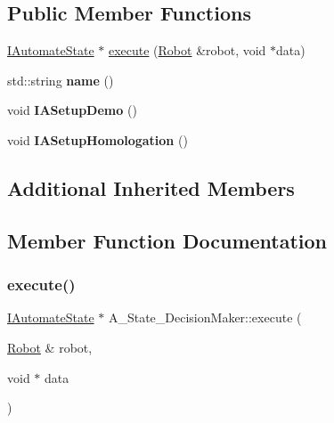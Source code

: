 \subsection*{Public Member Functions}
\begin{DoxyCompactItemize}
\item 
\hyperlink{classIAutomateState}{I\+Automate\+State} $\ast$ \hyperlink{classA__State__DecisionMaker_a960aa3cf18beb0b92fe1da1bb1ec42f1}{execute} (\hyperlink{classRobot}{Robot} \&robot, void $\ast$data)
\item 
\mbox{\label{classA__State__DecisionMaker_a1ef4270c4d26768849593f88b27b424d}} 
std\+::string {\bfseries name} ()
\item 
\mbox{\label{classA__State__DecisionMaker_a8060da7376c3223db8921c1bdc948f6e}} 
void {\bfseries I\+A\+Setup\+Demo} ()
\item 
\mbox{\label{classA__State__DecisionMaker_ac12110c5315179c96f5b9b0a73ab198b}} 
void {\bfseries I\+A\+Setup\+Homologation} ()
\end{DoxyCompactItemize}
\subsection*{Additional Inherited Members}


\subsection{Member Function Documentation}
\mbox{\label{classA__State__DecisionMaker_a960aa3cf18beb0b92fe1da1bb1ec42f1}} 
\subsubsection{\texorpdfstring{execute()}{execute()}}
{\footnotesize\ttfamily \hyperlink{classIAutomateState}{I\+Automate\+State} $\ast$ A\+\_\+\+State\+\_\+\+Decision\+Maker\+::execute (\begin{DoxyParamCaption}\item[{\hyperlink{classRobot}{Robot} \&}]{robot,  }\item[{void $\ast$}]{data }\end{DoxyParamCaption})}

